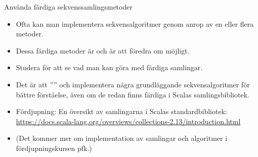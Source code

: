 \begin{Slide}{Använda färdiga sekvenssamlingsmetoder}
\begin{itemize}\SlideFontSmall
\item Ofta kan man implementera sekvensalgoritmer genom anrop av en eller flera  metoder.

\item Dessa färdiga metoder är  och är att föredra om möjligt.

\item Studera  för att se vad man kan göra med färdiga samlingar.

\item Det är  att '''' och implementera några grundläggande sekvensalgoritmer  för bättre förståelse, även om de redan finns färdiga i Scalas samlingsbibliotek.

\item Fördjupning: En översikt av samlingarna i Scalas standardbibliotek:
\url{https://docs.scala-lang.org/overviews/collections-2.13/introduction.html} 

\item (Det kommer mer om implementation av samlingar och algoritmer i fördjupningskursen pfk.)


\end{itemize}
\end{Slide}




